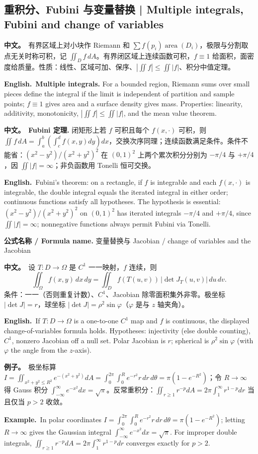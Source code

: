 \documentclass[UTF8,11pt,a4paper]{ctexart}
\newcommand{\BOTH}[2]{\par\noindent\textbf{中文。}\ #1\par\noindent\textbf{English.}\ #2\par}
\newcommand{\EX}[2]{\par\noindent\textbf{例子。}\ #1\par\noindent\textbf{Example.}\ #2\par}
\newcommand{\FORMULA}[2]{\par\noindent\textbf{公式名称 / Formula name.} #1 / #2\par}
\begin{document}
\subsection{重积分、Fubini 与变量替换 | Multiple integrals, Fubini and change of variables}
\BOTH{有界区域上对小块作 Riemann 和 $\sum f(p_i)\operatorname{area}(D_i)$，极限与分割取点无关时称可积，记 $\iint_Df\,dA$。有界闭区域上连续函数可积，$f\equiv1$ 给面积，面密度给质量。性质：线性、区域可加、保序、$|\iint f|\le\iint|f|$、积分中值定理。}{\textbf{Multiple integrals.} For a bounded region, Riemann sums over small pieces define the integral if the limit is independent of partition and sample points; $f\equiv1$ gives area and a surface density gives mass. Properties: linearity, additivity, monotonicity, $|\iint f|\le\iint|f|$, and the mean value theorem.}
\BOTH{\textbf{Fubini 定理.} 闭矩形上若 $f$ 可积且每个 $f(x,\cdot)$ 可积，则 $\iint f\,dA=\int_a^b(\int_c^df(x,y)dy)dx$，交换次序同理；连续函数满足条件。条件不能省：$(x^2-y^2)/(x^2+y^2)^2$ 在 $(0,1)^2$ 上两个累次积分分别为 $-\pi/4$ 与 $+\pi/4$，因 $\iint|f|=\infty$；非负函数用 Tonelli 恒可交换。}{Fubini's theorem: on a rectangle, if $f$ is integrable and each $f(x,\cdot)$ is integrable, the double integral equals the iterated integral in either order; continuous functions satisfy all hypotheses. The hypothesis is essential: $(x^2-y^2)/(x^2+y^2)^2$ on $(0,1)^2$ has iterated integrals $-\pi/4$ and $+\pi/4$, since $\iint|f|=\infty$; nonnegative functions always permit Fubini via Tonelli.}
\FORMULA{变量替换与 Jacobian}{change of variables and the Jacobian}
\BOTH{设 $T:D\to\Omega$ 是 $C^1$ 一一映射，$f$ 连续，则
\[
\iint_\Omega f(x,y)\,dx\,dy=\iint_D f(T(u,v))\,|\det J_T(u,v)|\,du\,dv .
\]
条件：一一（否则重复计数）、$C^1$、Jacobian 除零面积集外非零。极坐标 $|\det J|=r$，球坐标 $|\det J|=\rho^2\sin\varphi$（$\varphi$ 是与 $z$ 轴夹角）。}{If $T:D\to\Omega$ is a one-to-one $C^1$ map and $f$ is continuous, the displayed change-of-variables formula holds. Hypotheses: injectivity (else double counting), $C^1$, nonzero Jacobian off a null set. Polar Jacobian is $r$; spherical is $\rho^2\sin\varphi$ (with $\varphi$ the angle from the $z$-axis).}
\EX{极坐标算 $I=\iint_{x^2+y^2\le R^2}e^{-(x^2+y^2)}dA=\int_0^{2\pi}\int_0^R e^{-r^2}r\,dr\,d\theta=\pi(1-e^{-R^2})$；令 $R\to\infty$ 得 Gauss 积分 $\int_{-\infty}^{\infty}e^{-x^2}dx=\sqrt\pi$。反常重积分：$\iint_{r\ge1}r^{-p}dA=2\pi\int_1^\infty r^{1-p}dr$ 当且仅当 $p>2$ 收敛。}{In polar coordinates $I=\int_0^{2\pi}\int_0^R e^{-r^2}r\,dr\,d\theta=\pi(1-e^{-R^2})$; letting $R\to\infty$ gives the Gaussian integral $\int_{-\infty}^{\infty}e^{-x^2}dx=\sqrt\pi$. For improper double integrals, $\iint_{r\ge1}r^{-p}dA=2\pi\int_1^\infty r^{1-p}dr$ converges exactly for $p>2$.}
\end{document}
